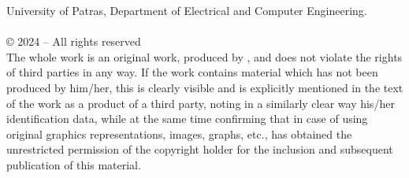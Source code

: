 \pagestyle{empty}

\vspace*{\fill}
\begin{flushleft}
	University of Patras, Department of Electrical and Computer Engineering.\\
	{\nommeEnglish} \\
	© 2024 – All rights reserved\\
	The whole work is an original work, produced by \nommeEnglish, and does not violate the rights of third parties in any way. If the work contains material which has not been produced by him/her, this is clearly visible and is explicitly mentioned in the text of the work as a product of a third party, noting in a similarly clear way his/her identification data, while at the same time confirming that in case of using original graphics representations, images, graphs, etc., has obtained the unrestricted permission of the copyright holder for the inclusion and subsequent publication of this material. 
\end{flushleft}
